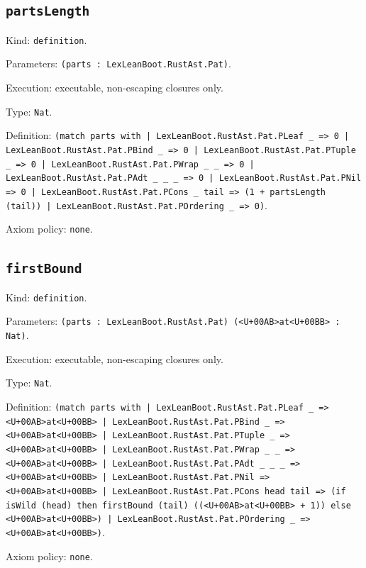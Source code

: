 \documentclass[11pt]{article}
\begin{document}
\subsection*{\texttt{partsLength}}
\noindent Kind: \texttt{definition}.\par
\noindent Parameters: \texttt{(parts : LexLeanBoot.RustAst.Pat)}.\par
\noindent Execution: executable, non-escaping closures only.\par
\noindent Type: \texttt{Nat}.\par
\noindent Definition: \texttt{(match parts with | LexLeanBoot.RustAst.Pat.PLeaf \_ => 0 | LexLeanBoot.RustAst.Pat.PBind \_ => 0 | LexLeanBoot.RustAst.Pat.PTuple \_ => 0 | LexLeanBoot.RustAst.Pat.PWrap \_ \_ => 0 | LexLeanBoot.RustAst.Pat.PAdt \_ \_ \_ => 0 | LexLeanBoot.RustAst.Pat.PNil => 0 | LexLeanBoot.RustAst.Pat.PCons \_ tail => (1 + partsLength (tail)) | LexLeanBoot.RustAst.Pat.POrdering \_ => 0)}.\par
\noindent Axiom policy: \texttt{none}.\par
\subsection*{\texttt{firstBound}}
\noindent Kind: \texttt{definition}.\par
\noindent Parameters: \texttt{(parts : LexLeanBoot.RustAst.Pat) (<U+00AB>at<U+00BB> : Nat)}.\par
\noindent Execution: executable, non-escaping closures only.\par
\noindent Type: \texttt{Nat}.\par
\noindent Definition: \texttt{(match parts with | LexLeanBoot.RustAst.Pat.PLeaf \_ => <U+00AB>at<U+00BB> | LexLeanBoot.RustAst.Pat.PBind \_ => <U+00AB>at<U+00BB> | LexLeanBoot.RustAst.Pat.PTuple \_ => <U+00AB>at<U+00BB> | LexLeanBoot.RustAst.Pat.PWrap \_ \_ => <U+00AB>at<U+00BB> | LexLeanBoot.RustAst.Pat.PAdt \_ \_ \_ => <U+00AB>at<U+00BB> | LexLeanBoot.RustAst.Pat.PNil => <U+00AB>at<U+00BB> | LexLeanBoot.RustAst.Pat.PCons head tail => (if isWild (head) then firstBound (tail) ((<U+00AB>at<U+00BB> + 1)) else <U+00AB>at<U+00BB>) | LexLeanBoot.RustAst.Pat.POrdering \_ => <U+00AB>at<U+00BB>)}.\par
\noindent Axiom policy: \texttt{none}.\par
\end{document}
